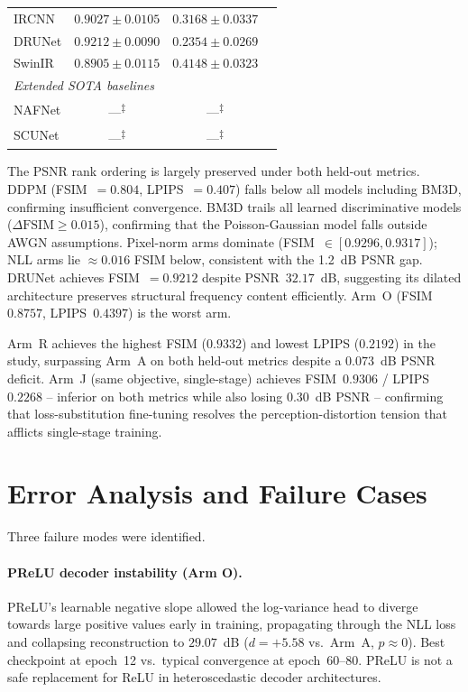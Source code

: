 \documentclass[12pt, a4paper, twoside, openright]{book}
\begin{document}
\begin{table}[htbp]
\begin{tabular}{lccc}
IRCNN \cite{zhang_learning_2017}        & $0.9027 \pm 0.0105$          & $0.3168 \pm 0.0337$ \\
DRUNet \cite{zhang_plug_2021}           & $0.9212 \pm 0.0090$          & $0.2354 \pm 0.0269$ \\
SwinIR \cite{liang_swinir_2021}         & $0.8905 \pm 0.0115$          & $0.4148 \pm 0.0323$ \\
\midrule
\multicolumn{3}{l}{\textit{Extended SOTA baselines}} \\
NAFNet \cite{chen_nafnet_2022}          & ---\textsuperscript{$\ddagger$} & ---\textsuperscript{$\ddagger$} \\
SCUNet \cite{zhang_scunet_2023}         & ---\textsuperscript{$\ddagger$} & ---\textsuperscript{$\ddagger$} \\
\bottomrule
\end{tabular}
\end{table}

The PSNR rank ordering is largely preserved under both held-out metrics. DDPM (FSIM~$=0.804$, LPIPS~$=0.407$) falls below all models including BM3D, confirming insufficient convergence. BM3D trails all learned discriminative models ($\Delta\mathrm{FSIM}\geq0.015$), confirming that the Poisson-Gaussian model falls outside AWGN assumptions. Pixel-norm arms dominate (FSIM~$\in[0.9296,0.9317]$); NLL arms lie $\approx0.016$ FSIM below, consistent with the 1.2~dB PSNR gap. DRUNet achieves FSIM~$=0.9212$ despite PSNR~$32.17$~dB, suggesting its dilated architecture preserves structural frequency content efficiently. Arm~O (FSIM~$0.8757$, LPIPS~$0.4397$) is the worst arm.

Arm~R achieves the highest FSIM ($0.9332$) and lowest LPIPS ($0.2192$) in the study, surpassing Arm~A on both held-out metrics despite a $0.073$~dB PSNR deficit. Arm~J (same objective, single-stage) achieves FSIM~$0.9306$ / LPIPS~$0.2268$ -- inferior on both metrics while also losing $0.30$~dB PSNR -- confirming that loss-substitution fine-tuning resolves the perception-distortion tension that afflicts single-stage training.

\section{Error Analysis and Failure Cases}
\label{sec:results:error}

Three failure modes were identified.

\paragraph{PReLU decoder instability (Arm O).}
PReLU's learnable negative slope allowed the log-variance head to diverge towards large positive values early in training, propagating through the NLL loss and collapsing reconstruction to $29.07$~dB ($d=+5.58$ vs.\ Arm~A, $p\approx0$). Best checkpoint at epoch~12 vs.\ typical convergence at epoch~60--80. PReLU is not a safe replacement for ReLU in heteroscedastic decoder architectures.
\end{document}
